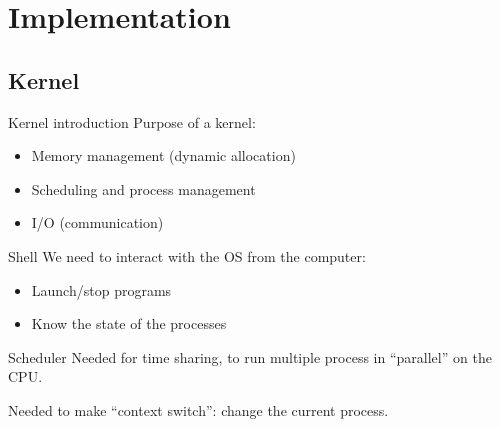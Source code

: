 \documentclass{beamer}
\begin{document}
  \section{Implementation}

    \subsection{Kernel}
      \begin{frame}{Kernel introduction}
        Purpose of a kernel:
        \begin{itemize}
          \item Memory management (dynamic allocation)
          \item Scheduling and process management
          \item I/O (communication)
        \end{itemize}
      \end{frame}

      \begin{frame}{Shell}
          We need to interact with the OS from the computer:
          \begin{itemize}
            \item Launch/stop programs
            \item Know the state of the processes
          \end{itemize}
      \end{frame}

      \begin{frame}{Scheduler}
        Needed for time sharing, to run multiple process in ``parallel'' on the
        CPU.

        \begin{figure}
            \centering
        \end{figure}

        Needed to make ``context switch'': change the current process.
      \end{frame}
\end{document}
